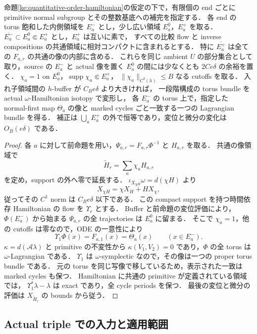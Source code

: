 \begin{theorem}
\label{ke:relative-corner-patch}
命題\ref{ke:quantitative-order-hamiltonian}の仮定の下で，有限個の end ごとに
primitive normal subgroup とその整数基底への補完を指定する．
各 end の torus 飽和した内側領域を $E_a^-$ とし，少し広い領域 $E_a^0$，$E_a^+$ を取る．
$\overline{E_a^-}\subset E_a^0\Subset E_a^+$ とし，$E_a^+$ は互いに素で，
すべての比較 flow と inverse compositions の共通領域に相対コンパクトに含まれるとする．
特に $\overline{E_a^+}$ は全ての $F_{a,r}$ の共通の像の内部に含める．
これらを同じ ambient $U$ の部分集合として取り，source の $E_a^-$ と
actual 像を置く $E_a^0$ の間には少なくとも $2Ce\delta$ の余裕を置く．
$\chi_a=1$ on $E_a^0$，$\operatorname{supp}\chi_a\Subset E_a^+$，
$\|\chi_a\|_{C^3(h)}\le B$ なる cutoffs を取る．
入れ子領域間の $h$-buffer が $C_B e\delta$ より大きければ，
一段階構成の torus bundle を actual $\omega$-Hamiltonian isotopy で変形し，
各 $E_a^-$ の torus 上で，指定した normal-first map $\Theta_a$ の像と
marked cycles ごと一致する一つの Lagrangian bundle を得る．
補正は $\bigcup_a E_a^+$ の外で恒等であり，変位と微分の変化は $O_B(e\delta)$ である．
\end{theorem}

\begin{proof}
各 $a$ に対して前命題を用い，$\Psi_{a,r}=F_{a,r}\Phi^{-1}$ と $H_{a,r}$ を取る．
共通の像領域で
\[
 \widetilde H_r=\sum_a\chi_a H_{a,r}
\]
を定め，support の外へ零で延長する．
$\iota_{X_{\chi H}}\omega=d(\chi H)$ より
\[
 X_{\chi H}=\chi X_H+H X_\chi,
\]
従ってその $C^1$ norm は $C_B e\delta$ 以下である．
この compact support を持つ時間依存 Hamiltonian の flow を $\Upsilon_r$ とする．
Buffer と前命題の変位評価により，$\Phi(E_a^-)$ から始まる
$\Psi_{a,r}$ の全 trajectories は $E_a^0$ に留まる．
そこで $\chi_a=1$，他の cutoffs は零なので，ODE の一意性により
\[
 \Upsilon_1\Phi(x)=F_{a,1}(x)=\Theta_a(x)\qquad(x\in E_a^-).
\]
$\kappa=d(\mathcal A\lambda)$ と primitive の不変性から
$\kappa(V_1,V_2)=0$ であり，$\Phi$ の全 torus は $\omega$-Lagrangian である．
$\Upsilon_1$ は $\omega$-symplectic なので，その像は一つの proper torus bundle である．
元の torus を同じ写像で移しているため，表示された一致は marked cycles も保つ．
Hamiltonian に共通の primitive が定義されている領域では，
$\Upsilon_1^*\lambda-\lambda$ は exact であり，全 cycle periods を保つ．
最後の変位と微分の評価は $X_{\widetilde H_r}$ の bounds から従う．
\end{proof}

\subsection{Actual triple での入力と適用範囲}

